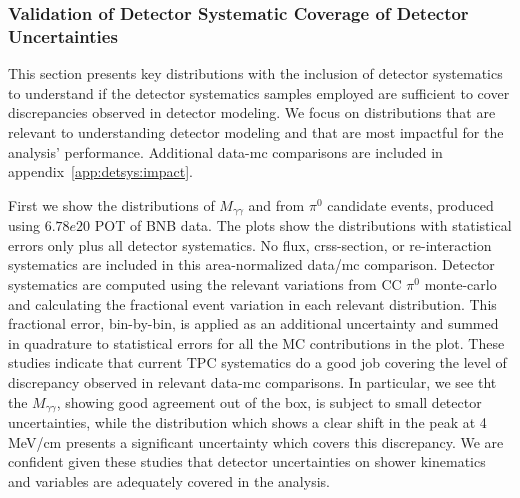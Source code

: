 \subsubsection{Validation of Detector Systematic Coverage of Detector Uncertainties}
\label{sec:detsys:datamc}
\par This section presents key distributions with the inclusion of detector systematics to understand if the detector systematics samples employed are sufficient to cover discrepancies observed in detector modeling. We focus on distributions that are relevant to understanding detector modeling and that are most impactful for the analysis' performance. Additional data-mc comparisons are included in appendix~\ref{app:detsys:impact}.
\par First we show the distributions of $M_{\gamma\gamma}$ and \dedx from $\pi^0$ candidate events, produced using $6.78e20$ POT of BNB data. 
The plots show the distributions with statistical errors only plus all detector systematics. No flux, crss-section, or re-interaction systematics are included in this area-normalized data/mc comparison. Detector systematics are computed using the relevant variations from CC $\pi^0$ monte-carlo and calculating the fractional event variation in each relevant distribution. This fractional error, bin-by-bin, is applied as an additional uncertainty and summed in quadrature to statistical errors for all the MC contributions in the plot. These studies indicate that current TPC systematics do a good job covering the level of discrepancy observed in relevant data-mc comparisons. In particular, we see tht the $M_{\gamma\gamma}$, showing good agreement out of the box, is subject to small detector uncertainties, while the \dedx distribution which shows  a clear shift in the peak at 4 MeV/cm presents a significant uncertainty which covers this discrepancy. We are confident given these studies that detector uncertainties on shower kinematics and variables are adequately covered in the analysis.

